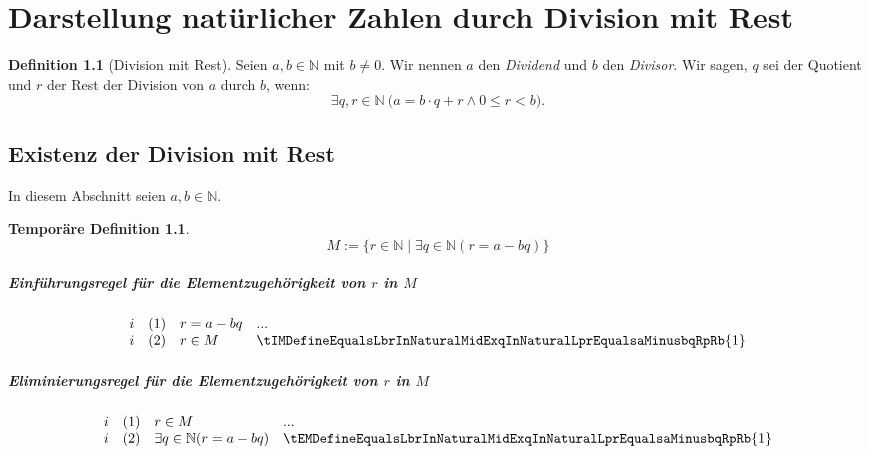 \documentclass{book}
\theoremstyle{plain}
\theoremstyle{remark}
\theoremstyle{definition}
\newtheorem{definition}{Definition}[section]
\newtheorem*{tempdefinition}{Temporäre Definition}
\begin{document}
\chapter{Darstellung natürlicher Zahlen durch Division mit Rest}

\begin{definition}[Division mit Rest]
Seien \( a, b \in \mathbb{N} \) mit \( b \neq 0 \). Wir nennen \( a \) den \emph{Dividend} und \( b \) den \emph{Divisor}. Wir sagen, \( q \) sei der Quotient und \( r \) der Rest der Division von \( a \) durch \( b \), wenn:
\[
\exists q, r \in \mathbb{N} \ \big(a = b \cdot q + r \land 0 \leq r < b\big).
\]
\end{definition}


\section{Existenz der Division mit Rest}
In diesem Abschnitt seien \(a,b\in\mathbb{N}\).

\begin{tempdefinition}
    \[M:=\{r\in\mathbb{N}\mid \exists q\in\mathbb{N}(r=a-bq)\}\]
\end{tempdefinition}


\label{tIMDefineEqualsLbrInNaturalMidExqInNaturalLprEqualsaMinusbqRpRb}
\paragraph{Einführungsregel für die Elementzugehörigkeit von \(r\) in \(M\)}
\[
\begin{array}{llll}
    i & (1) & r=a-bq & ... \\
    i & (2) & r\in M & \tIMDefineEqualsLbrInNaturalMidExqInNaturalLprEqualsaMinusbqRpRb{1}  \\
\end{array}
\]

\label{tEMDefineEqualsLbrInNaturalMidExqInNaturalLprEqualsaMinusbqRpRb}
\paragraph{Eliminierungsregel für die Elementzugehörigkeit von \(r\) in \(M\)}
\[
\begin{array}{llll}
    i & (1) & r\in M & ... \\
    i & (2) & \exists q\in\mathbb{N}(r=a-bq) & \tEMDefineEqualsLbrInNaturalMidExqInNaturalLprEqualsaMinusbqRpRb{1}  \\
\end{array}
\]
\end{document}
